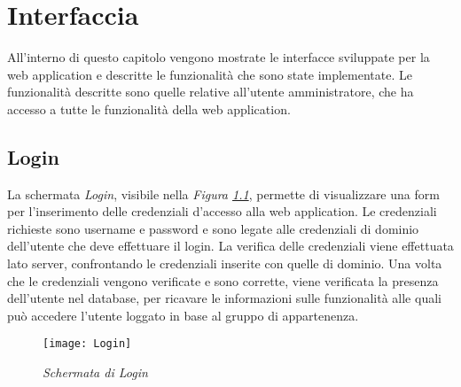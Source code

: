 \chapter{Interfaccia}
  \label{chapter_interfaccia}
  All'interno di questo capitolo vengono mostrate le interfacce sviluppate per la web application e descritte le funzionalità
  che sono state implementate. Le funzionalità descritte sono quelle relative all'utente amministratore, che ha accesso a tutte
  le funzionalità della web application.
  \section{Login}
  La schermata \textit{Login}, visibile nella \textit{Figura \ref{fig:Login}}, permette di visualizzare una form per
  l'inserimento delle credenziali d'accesso alla web application. Le credenziali richieste sono username e password e
  sono legate alle credenziali di dominio dell'utente che deve effettuare il login. La verifica delle credenziali viene
  effettuata lato server, confrontando le credenziali inserite con quelle di dominio. Una volta che le credenziali vengono
  verificate e sono corrette, viene verificata la presenza dell'utente nel database, per ricavare le informazioni sulle
  funzionalità alle quali può accedere l'utente loggato in base al gruppo di appartenenza.
  \begin{figure}[H]
    \texttt{[image: Login]}
    \centering
    \caption{\textit{Schermata di Login}}
    \label{fig:Login}
  \end{figure}

